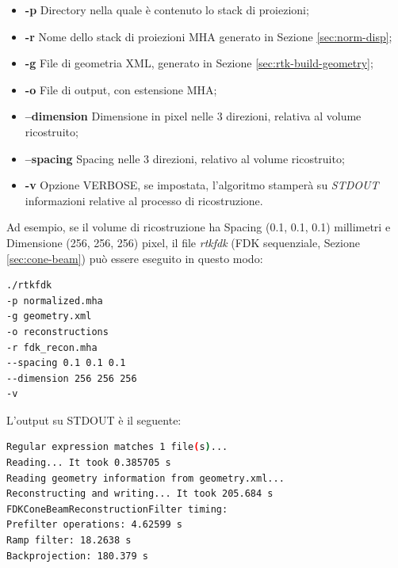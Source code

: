\documentclass[a4paper,12pt, doubleside]{report}
\begin{document}
                \begin{itemize}
                    \item \textbf{-p} Directory nella quale è contenuto lo stack di proiezioni;
                    \item \textbf{-r} Nome dello stack di proiezioni MHA generato in Sezione \ref{sec:norm-disp};
                    \item \textbf{-g} File di geometria XML, generato in Sezione \ref{sec:rtk-build-geometry};
                    \item \textbf{-o} File di output, con estensione MHA;
                    \item \textbf{--dimension} Dimensione in pixel nelle 3 direzioni, relativa al volume ricostruito;
                    \item \textbf{--spacing} Spacing nelle 3 direzioni, relativo al volume ricostruito;
                    \item \textbf{-v} Opzione VERBOSE, se impostata, l'algoritmo stamperà su \textit{STDOUT} informazioni relative al processo di ricostruzione.
                \end{itemize}
                
                Ad esempio, se il volume di ricostruzione ha Spacing (0.1, 0.1, 0.1) millimetri e Dimensione (256, 256, 256) pixel, il file \textit{rtkfdk} (FDK sequenziale, Sezione \ref{sec:cone-beam}) può essere eseguito in questo modo:
               
                \begin{lstlisting}[language=bash, frame=bt]
./rtkfdk 
-p normalized.mha
-g geometry.xml 
-o reconstructions
-r fdk_recon.mha
--spacing 0.1 0.1 0.1
--dimension 256 256 256
-v
                \end{lstlisting}
            
            \par
            \bigskip
                L'output su STDOUT è il seguente:
            
                \begin{lstlisting}[language=bash, frame=bt]
Regular expression matches 1 file(s)...
Reading... It took 0.385705 s
Reading geometry information from geometry.xml...
Reconstructing and writing... It took 205.684 s
FDKConeBeamReconstructionFilter timing:
Prefilter operations: 4.62599 s
Ramp filter: 18.2638 s
Backprojection: 180.379 s
                \end{lstlisting}
                
\end{document}
